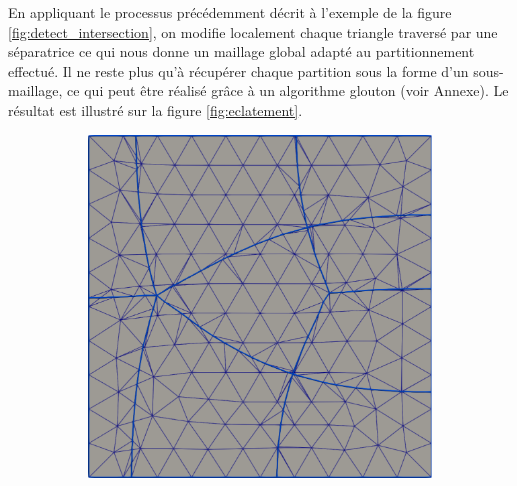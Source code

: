 En appliquant le processus précédemment décrit à l'exemple de la figure \ref{fig:detect_intersection}, on modifie localement chaque triangle traversé par une séparatrice ce qui nous donne un maillage global adapté au partitionnement effectué. Il ne reste plus qu'à récupérer chaque partition sous la forme d'un sous-maillage, ce qui peut être réalisé grâce à un algorithme glouton (voir Annexe). Le résultat est illustré sur la figure \ref{fig:eclatement}.

\begin{figure}[h!]
\centering
\begin{subfigure}{0.49\textwidth}
    \includegraphics[width=\textwidth]{images/eclatement_2.pdf}
\end{subfigure}
\hfill
\begin{subfigure}{0.49\textwidth}

\end{subfigure}
\end{figure}
